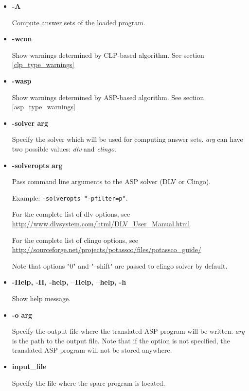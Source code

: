\documentclass[12pt, letterpaper]{article}
\begin{document}
\begin{itemize}
 \item \textbf{-A}
    
  Compute answer sets of the loaded program.

\item \textbf{-wcon}
    
  Show warnings determined by CLP-based algorithm. See section \ref{clp_type_warnings}

\item \textbf{-wasp}
    
  Show warnings determined by ASP-based algorithm. See section \ref{asp_type_warnings}

\item \textbf{-solver arg}

  Specify the solver which will be used for computing answer sets. \textit{arg} can have two possible values: \textit{dlv} and \textit{clingo}. 
\item \textbf{-solveropts arg}

  Pass command line arguments to the ASP solver (DLV or Clingo).
  
  Example: \texttt{-solveropts "-pfilter=p"}.


  For the complete list of dlv options, see 
  \url{http://www.dlvsystem.com/html/DLV_User_Manual.html }


  For the complete list of clingo options, see 
  \url{http://sourceforge.net/projects/potassco/files/potassco_guide/}

  Note that options "0" and "--shift" are passed to clingo solver by default.

\item \textbf{-Help, -H, -help, --Help, --help, -h}

  Show help message.

\item \textbf{-o arg}

  Specify the output file where the translated ASP program will be written. \textit{arg} is the path to the output file. 
  Note that if the option is not specified, the translated ASP program will not be stored anywhere.

\item \textbf{input\_file}
  
Specify the file where the sparc program is located.



\end{itemize}
\end{document}
